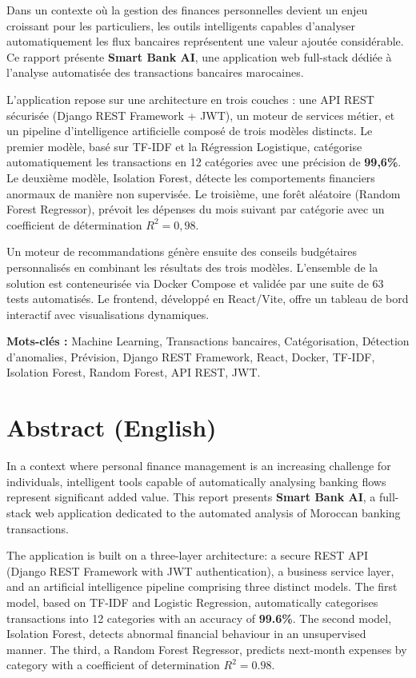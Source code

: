 \documentclass[12pt,a4paper]{report}
\begin{document}
Dans un contexte où la gestion des finances personnelles devient un enjeu
croissant pour les particuliers, les outils intelligents capables d'analyser
automatiquement les flux bancaires représentent une valeur ajoutée considérable.
Ce rapport présente \textbf{Smart Bank AI}, une application web full-stack
dédiée à l'analyse automatisée des transactions bancaires marocaines.

L'application repose sur une architecture en trois couches : une API REST
sécurisée (Django REST Framework + JWT), un moteur de services métier, et
un pipeline d'intelligence artificielle composé de trois modèles distincts.
Le premier modèle, basé sur TF-IDF et la Régression Logistique, catégorise
automatiquement les transactions en 12 catégories avec une précision de
\textbf{99{,}6\%}. Le deuxième modèle, Isolation Forest, détecte les
comportements financiers anormaux de manière non supervisée. Le troisième,
une forêt aléatoire (Random Forest Regressor), prévoit les dépenses du mois
suivant par catégorie avec un coefficient de détermination \(R^2 = 0{,}98\).

Un moteur de recommandations génère ensuite des conseils budgétaires
personnalisés en combinant les résultats des trois modèles. L'ensemble de
la solution est conteneurisée via Docker Compose et validée par une suite
de 63 tests automatisés. Le frontend, développé en React/Vite, offre un
tableau de bord interactif avec visualisations dynamiques.

\vspace{0.5cm}
\textbf{Mots-clés :} Machine Learning, Transactions bancaires, Catégorisation,
Détection d'anomalies, Prévision, Django REST Framework, React, Docker, TF-IDF,
Isolation Forest, Random Forest, API REST, JWT.

\section*{Abstract (English)}

In a context where personal finance management is an increasing challenge
for individuals, intelligent tools capable of automatically analysing
banking flows represent significant added value. This report presents
\textbf{Smart Bank AI}, a full-stack web application dedicated to the
automated analysis of Moroccan banking transactions.

The application is built on a three-layer architecture: a secure REST API
(Django REST Framework with JWT authentication), a business service layer,
and an artificial intelligence pipeline comprising three distinct models.
The first model, based on TF-IDF and Logistic Regression, automatically
categorises transactions into 12 categories with an accuracy of
\textbf{99.6\%}. The second model, Isolation Forest, detects abnormal
financial behaviour in an unsupervised manner. The third, a Random Forest
Regressor, predicts next-month expenses by category with a coefficient of
determination \(R^2 = 0.98\).
\end{document}
